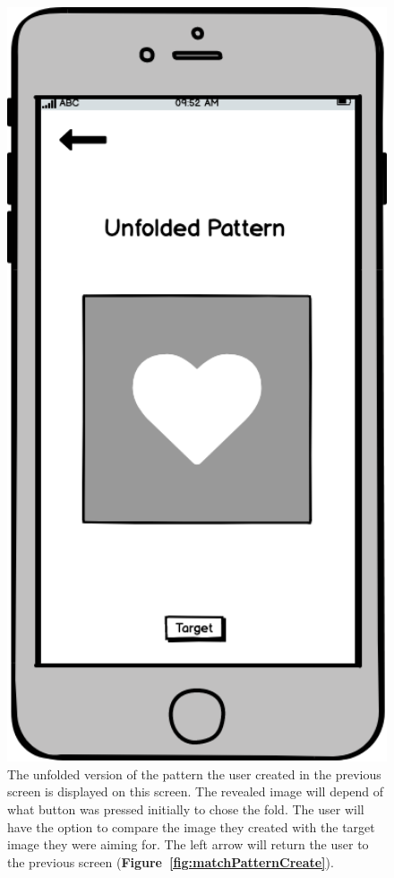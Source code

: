 \documentclass[11pt]{article}
\begin{document}
            \begin{figure}
                \begin{minipage}[c]{0.65\textwidth}
                \caption{The unfolded version of the pattern the user created in the previous screen is displayed on this screen. The revealed image will depend of what button was pressed initially to chose the fold. The user will have the option to compare the image they created with the target image they were aiming for. The left arrow will return the user to the previous screen (\textbf{Figure~\ref{fig:matchPatternCreate}}).}
                \label{fig:revealWithOverlay}
                \end{minipage}\hfill
                \begin{minipage}[c]{0.35\textwidth}
                \includegraphics[width=1\textwidth]{Images/Prototype/prototypeRevealWithOverlay}

\end{minipage}
\end{figure}
\end{document}
